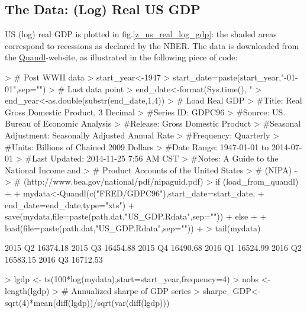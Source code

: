 \documentclass[a4paper]{book}
\begin{document}
\subsection{The Data: (Log) Real US GDP}

US (log) real GDP is plotted in fig.\ref{z_us_real_log_gdp}: the shaded areas correspond to recessions as declared by the NBER. The data is downloaded from the \href{https://www.quandl.com}{Quandl}-website, as illustrated in the following piece of code:
\begin{Schunk}
\begin{Sinput}
> # Post WWII data
> start_year<-1947 
> start_date=paste(start_year,"-01-01",sep="")
> # Last data point
> end_date<-format(Sys.time(), "%
> end_year<-as.double(substr(end_date,1,4))
> # Load Real GDP
> #Title:               Real Gross Domestic Product, 3 Decimal
> #Series ID:           GDPC96
> #Source:              US. Bureau of Economic Analysis
> #Release:             Gross Domestic Product
> #Seasonal Adjustment: Seasonally Adjusted Annual Rate
> #Frequency:           Quarterly
> #Units:               Billions of Chained 2009 Dollars
> #Date Range:          1947-01-01 to 2014-07-01
> #Last Updated:        2014-11-25 7:56 AM CST
> #Notes:               A Guide to the National Income and 
> #                     Product Accounts of the United States 
> #                     (NIPA) - 
> #   (http://www.bea.gov/national/pdf/nipaguid.pdf)
> if (load_from_quandl)
+ {
+   mydata<-Quandl(c("FRED/GDPC96"),start_date=start_date,
+                end_date=end_date,type="xts")
+   save(mydata,file=paste(path.dat,"US_GDP.Rdata",sep=""))
+ } else
+ {
+   load(file=paste(path.dat,"US_GDP.Rdata",sep=""))
+ }
> tail(mydata)
\end{Sinput}
\begin{Soutput}
            [,1]
2015 Q2 16374.18
2015 Q3 16454.88
2015 Q4 16490.68
2016 Q1 16524.99
2016 Q2 16583.15
2016 Q3 16712.53
\end{Soutput}
\begin{Sinput}
> lgdp <- ts(100*log(mydata),start=start_year,frequency=4)
> nobs <- length(lgdp)
> # Annualized sharpe of GDP series
> sharpe_GDP<-sqrt(4)*mean(diff(lgdp))/sqrt(var(diff(lgdp)))
\end{Sinput}
\end{Schunk}
\end{document}
